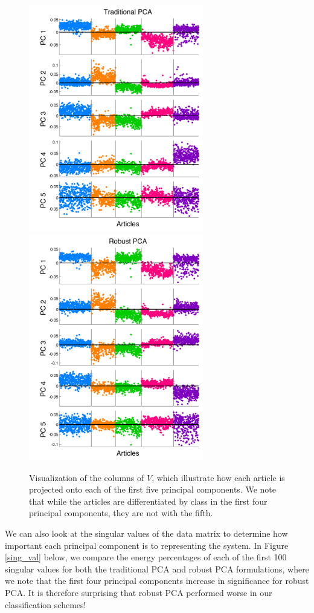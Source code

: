 \documentclass[12pt]{article}
\begin{document}
\begin{figure}[H]
\centering
\includegraphics[width=3in]{figures/principalcomponents_original} \quad
\includegraphics[width=3in]{figures/principalcomponents_robust}
\caption{Visualization of the columns of $V$, which illustrate how each article is projected onto each of the first five principal components. We note that while the articles are differentiated by class in the first four principal components, they are not with the fifth. }
\end{figure}

We can also look at the singular values of the data matrix to determine how important each principal component is to representing the system. In Figure \ref{sing_val} below, we compare the energy percentages of each of the first 100 singular values for both the traditional PCA and robust PCA formulations, where we note that the first four principal components increase in significance for robust PCA. It is therefore surprising that robust PCA performed worse in our classification schemes! 
\end{document}
